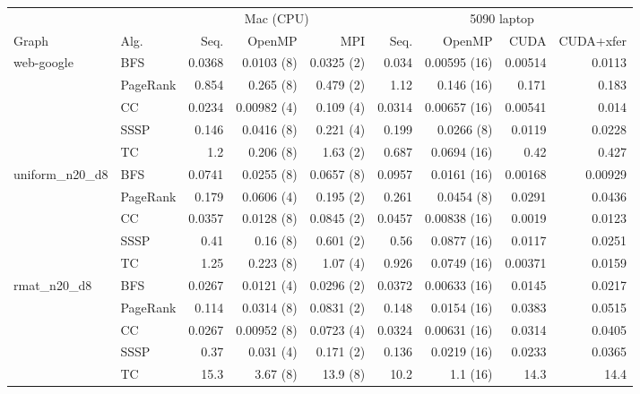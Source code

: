 \begin{tabular}{@{}llrrrrrrr@{}}
\toprule
 & & \multicolumn{3}{c}{Mac (CPU)} & \multicolumn{4}{c}{5090 laptop} \\
\cmidrule(lr){3-5}\cmidrule(lr){6-9}
Graph & Alg. & Seq. & OpenMP & MPI & Seq. & OpenMP & CUDA & CUDA+xfer \\
\midrule
web-google & BFS & 0.0368 & 0.0103 (8) & 0.0325 (2) & 0.034 & 0.00595 (16) & 0.00514 & 0.0113 \\
 & PageRank & 0.854 & 0.265 (8) & 0.479 (2) & 1.12 & 0.146 (16) & 0.171 & 0.183 \\
 & CC & 0.0234 & 0.00982 (4) & 0.109 (4) & 0.0314 & 0.00657 (16) & 0.00541 & 0.014 \\
 & SSSP & 0.146 & 0.0416 (8) & 0.221 (4) & 0.199 & 0.0266 (8) & 0.0119 & 0.0228 \\
 & TC & 1.2 & 0.206 (8) & 1.63 (2) & 0.687 & 0.0694 (16) & 0.42 & 0.427 \\
\midrule
uniform\_n20\_d8 & BFS & 0.0741 & 0.0255 (8) & 0.0657 (8) & 0.0957 & 0.0161 (16) & 0.00168 & 0.00929 \\
 & PageRank & 0.179 & 0.0606 (4) & 0.195 (2) & 0.261 & 0.0454 (8) & 0.0291 & 0.0436 \\
 & CC & 0.0357 & 0.0128 (8) & 0.0845 (2) & 0.0457 & 0.00838 (16) & 0.0019 & 0.0123 \\
 & SSSP & 0.41 & 0.16 (8) & 0.601 (2) & 0.56 & 0.0877 (16) & 0.0117 & 0.0251 \\
 & TC & 1.25 & 0.223 (8) & 1.07 (4) & 0.926 & 0.0749 (16) & 0.00371 & 0.0159 \\
\midrule
rmat\_n20\_d8 & BFS & 0.0267 & 0.0121 (4) & 0.0296 (2) & 0.0372 & 0.00633 (16) & 0.0145 & 0.0217 \\
 & PageRank & 0.114 & 0.0314 (8) & 0.0831 (2) & 0.148 & 0.0154 (16) & 0.0383 & 0.0515 \\
 & CC & 0.0267 & 0.00952 (8) & 0.0723 (4) & 0.0324 & 0.00631 (16) & 0.0314 & 0.0405 \\
 & SSSP & 0.37 & 0.031 (4) & 0.171 (2) & 0.136 & 0.0219 (16) & 0.0233 & 0.0365 \\
 & TC & 15.3 & 3.67 (8) & 13.9 (8) & 10.2 & 1.1 (16) & 14.3 & 14.4 \\
\bottomrule
\end{tabular}
